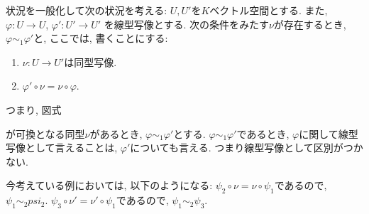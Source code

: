 状況を一般化して次の状況を考える:
$U,U'$を$K$ベクトル空間とする.
また, $\varphi\colon U\to U$,
$\varphi'\colon U'\to U'$
を線型写像とする.
次の条件をみたす$\nu$が存在するとき,
$\varphi\sim_1\varphi'$と, ここでは, 書くことにする:
\begin{enumerate}
  \item $\nu\colon U\to U'$は同型写像.
  \item $\varphi'\circ\nu=\nu\circ\varphi$.
\end{enumerate}
つまり, 図式
\begin{center}
\end{center}
が可換となる同型$\nu$があるとき,
$\varphi\sim_1\varphi'$とする.
$\varphi\sim_1\varphi'$であるとき,
$\varphi$に関して線型写像として言えることは,
$\varphi'$についても言える.
つまり線型写像として区別がつかない.


今考えている例においては, 
以下のようになる:
$\psi_2\circ\nu= \nu\circ\psi_1$であるので,
$\psi_1\sim_2 psi_2$.
$\psi_3\circ\nu'= \nu'\circ\psi_1$であるので,
$\psi_1\sim_2 \psi_3$.


